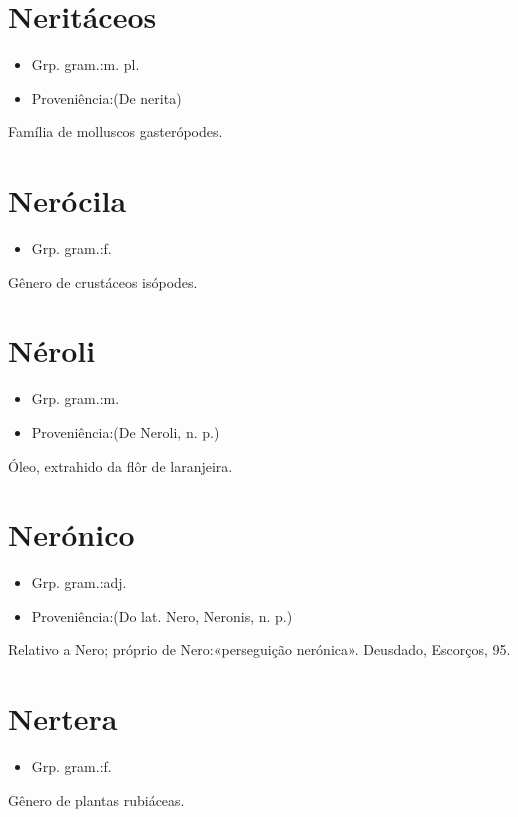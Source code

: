 \section{Neritáceos}
\begin{itemize}
\item {Grp. gram.:m. pl.}
\end{itemize}
\begin{itemize}
\item {Proveniência:(De \textunderscore nerita\textunderscore )}
\end{itemize}
Família de molluscos gasterópodes.
\section{Nerócila}
\begin{itemize}
\item {Grp. gram.:f.}
\end{itemize}
Gênero de crustáceos isópodes.
\section{Néroli}
\begin{itemize}
\item {Grp. gram.:m.}
\end{itemize}
\begin{itemize}
\item {Proveniência:(De \textunderscore Neroli\textunderscore , n. p.)}
\end{itemize}
Óleo, extrahido da flôr de laranjeira.
\section{Nerónico}
\begin{itemize}
\item {Grp. gram.:adj.}
\end{itemize}
\begin{itemize}
\item {Proveniência:(Do lat. \textunderscore Nero\textunderscore , \textunderscore Neronis\textunderscore , n. p.)}
\end{itemize}
Relativo a Nero; próprio de Nero:«\textunderscore perseguição nerónica\textunderscore ». Deusdado, \textunderscore Escorços\textunderscore , 95.
\section{Nertera}
\begin{itemize}
\item {Grp. gram.:f.}
\end{itemize}
Gênero de plantas rubiáceas.
